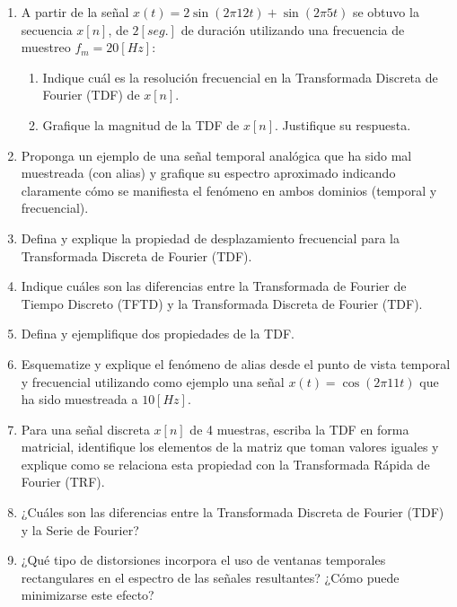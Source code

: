 \documentclass[a4paper,10pt,spanish]{article}
\begin{document}
\begin{enumerate}
\item A partir de la señal $x(t)=2\sin(2\pi 12t)+\sin(2\pi 5t)$ se obtuvo la secuencia $x[n]$, de $2[seg.]$ de duración utilizando una frecuencia de muestreo $f_{m}=20 [Hz]$:
	\begin{enumerate}
	\item Indique cuál es la resolución frecuencial en la Transformada Discreta de 			Fourier (TDF) de $x[n]$.

	\item Grafique la magnitud de la TDF de $x[n]$. Justifique su respuesta.
	\end{enumerate}

\item Proponga un ejemplo de una señal temporal analógica que ha sido mal muestreada (con alias) y grafique su espectro aproximado indicando claramente cómo se manifiesta el fenómeno en ambos dominios (temporal y frecuencial).

\item Defina y explique la propiedad de desplazamiento frecuencial para la Transformada Discreta de Fourier (TDF).

\item Indique cuáles son las diferencias entre la Transformada de Fourier de Tiempo Discreto (TFTD) y la Transformada Discreta de Fourier (TDF).

\item Defina y ejemplifique dos propiedades de la TDF.

\item Esquematize y explique el fenómeno de alias desde el punto de vista temporal y frecuencial utilizando como ejemplo una señal $x(t) = \cos(2\pi 11t)$ que ha sido muestreada a $10[Hz]$.

\item Para una señal discreta $x[n]$ de 4 muestras, escriba la TDF en forma matricial, identifique los elementos de la matriz que toman valores iguales y explique como se relaciona esta propiedad con la Transformada Rápida de Fourier (TRF).

\item ¿Cuáles son las diferencias entre la Transformada Discreta de Fourier (TDF) y la Serie de Fourier?

\item ¿Qué tipo de distorsiones incorpora el uso de ventanas temporales rectangulares en el espectro de las señales resultantes? ¿Cómo puede minimizarse este efecto?


\end{enumerate}
\end{document}
